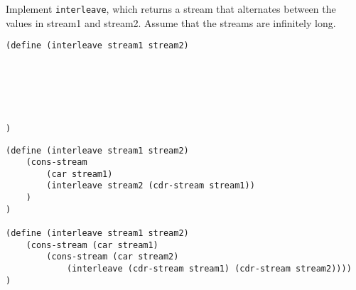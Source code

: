 \begin{blocksection}
\question Implement \lstinline$interleave$, which returns a stream that alternates between the values in stream1 and stream2.
Assume that the streams are infinitely long.

\ifprintanswers\else
\begin{lstlisting}
(define (interleave stream1 stream2)






)
\end{lstlisting}
\fi

\begin{solution}[1in]
\begin{lstlisting}
(define (interleave stream1 stream2)
    (cons-stream
        (car stream1)
        (interleave stream2 (cdr-stream stream1))
    )
)

(define (interleave stream1 stream2)
    (cons-stream (car stream1)
        (cons-stream (car stream2)
            (interleave (cdr-stream stream1) (cdr-stream stream2))))
)
\end{lstlisting}
\end{solution}
\end{blocksection}
